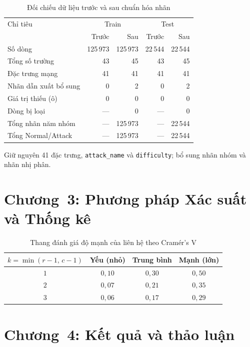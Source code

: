 \documentclass[../main.tex]{subfiles}
\begin{document}
\begin{table}[H]
\centering
\caption{Đối chiếu dữ liệu trước và sau chuẩn hóa nhãn}
\label{tab:t2:beforeafter}
\small
\setlength{\tabcolsep}{3pt}
\begin{tabular}{p{7.5cm}rrrr}
\toprule
Chỉ tiêu & \multicolumn{2}{c}{Train} & \multicolumn{2}{c}{Test} \\ & Trước & Sau & Trước & Sau \\
\midrule
Số dòng & 125\,973 & 125\,973 & 22\,544 & 22\,544 \\
Tổng số trường & 43 & 45 & 43 & 45 \\
Đặc trưng mạng & 41 & 41 & 41 & 41 \\
Nhãn dẫn xuất bổ sung & 0 & 2 & 0 & 2 \\
Giá trị thiếu (ô) & 0 & 0 & 0 & 0 \\
Dòng bị loại & --- & 0 & --- & 0 \\
Tổng nhãn năm nhóm & --- & 125\,973 & --- & 22\,544 \\
Tổng Normal/Attack & --- & 125\,973 & --- & 22\,544 \\
\bottomrule
\end{tabular}
\par\smallskip\footnotesize Giữ nguyên 41 đặc trưng, \texttt{attack\_name} và \texttt{difficulty}; bổ sung nhãn nhóm và nhãn nhị phân.
\end{table}

\section{Chương~3: Phương pháp Xác suất và Thống kê}

\begin{table}[H]
  \centering
  \caption{Thang đánh giá độ mạnh của liên hệ theo Cramér's V\cite{task34_kim2017}}
  \label{tab:t34:cramer-scale}
  \begin{tabular}{cccc}
    \toprule
    $k = \min(r-1,\, c-1)$ & Yếu (nhỏ) & Trung bình & Mạnh (lớn) \\
    \midrule
    $1$ & $0{,}10$ & $0{,}30$ & $0{,}50$ \\
    $2$ & $0{,}07$ & $0{,}21$ & $0{,}35$ \\
    $3$ & $0{,}06$ & $0{,}17$ & $0{,}29$ \\
    \bottomrule
  \end{tabular}
\end{table}

\section{Chương~4: Kết quả và thảo luận}
\end{document}
